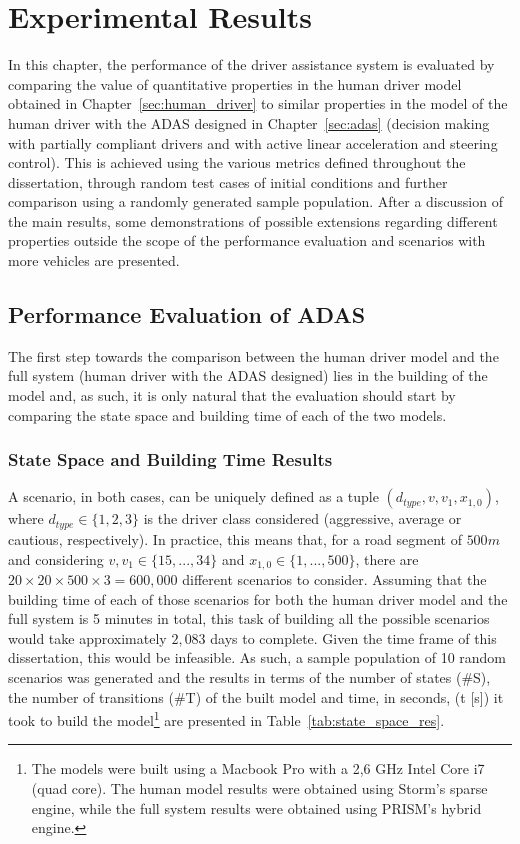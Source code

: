 \chapter{Experimental Results}
\label{sec:results}

In this chapter, the performance of the driver assistance system is evaluated by comparing the value of quantitative properties in the human driver model obtained in Chapter~\ref{sec:human_driver} to similar properties in the model of the human driver with the ADAS designed in Chapter~\ref{sec:adas} (decision making with partially compliant drivers and with active linear acceleration and steering control). This is achieved using the various metrics defined throughout the dissertation, through random test cases of initial conditions and further comparison using a randomly generated sample population. After a discussion of the main results, some demonstrations of possible extensions regarding different properties outside the scope of the performance evaluation and scenarios with more vehicles are presented.

\section{Performance Evaluation of ADAS}

The first step towards the comparison between the human driver model and the full system (human driver with the ADAS designed) lies in the building of the model and, as such, it is only natural that the evaluation should start by comparing the state space and building time of each of the two models.

\subsection{State Space and Building Time Results}
\label{sec:res_state}

A scenario, in both cases, can be uniquely defined as a tuple $(d_{type}, v, v_1, x_{1,0})$, where $d_{type} \in \{1,2,3\}$ is the driver class considered (aggressive, average or cautious, respectively). In practice, this means that, for a road segment of $500m$ and considering $v, v_1 \in \{15,...,34\}$ and $x_{1,0} \in \{1,...,500\}$, there are $20 \times 20 \times 500 \times 3 = 600,000$ different scenarios to consider. Assuming that the building time of each of those scenarios for both the human driver model and the full system is 5 minutes in total, this task of building all the possible scenarios would take approximately $2,083$ days to complete. Given the time frame of this dissertation, this would be infeasible. As such, a sample population of 10 random scenarios was generated and the results in terms of the number of states (\#S), the number of transitions (\#T) of the built model and time, in seconds, (t [s]) it took to build the model\footnote{The models were built using a Macbook Pro with a 2,6 GHz Intel Core i7 (quad core). The human model results were obtained using Storm's sparse engine, while the full system results were obtained using PRISM's hybrid engine.} are presented in Table~\ref{tab:state_space_res}.

